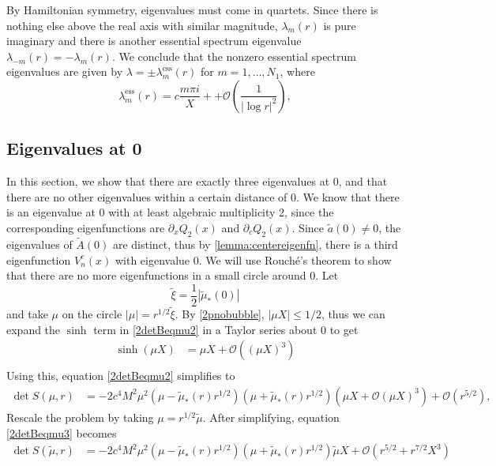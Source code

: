 \documentclass[thesis.tex]{subfiles}
\begin{document}
By Hamiltonian symmetry, eigenvalues must come in quartets. Since there is nothing else above the real axis with similar magnitude, $\lambda_m(r)$ is pure imaginary and there is another essential spectrum eigenvalue $\lambda_{-m}(r) = -\lambda_m(r)$. We conclude that the nonzero essential spectrum eigenvalues are given by $\lambda = \pm \lambda_m^{\text{ess}}(r)$ for $m = 1, \dots, N_1$, where
\[
\lambda_m^{\text{ess}}(r) = c \frac{m \pi i}{X} + +\mathcal{O}\left( \frac{1}{|\log r|^2} \right),
\]

\subsection{Eigenvalues at 0}\label{sec:eigcount0}

In this section, we show that there are exactly three eigenvalues at 0, and that there are no other eigenvalues within a certain distance of 0. We know that there is an eigenvalue at 0 with at least algebraic multiplicity 2, since the corresponding eigenfunctions are $\partial_x Q_2(x)$ and $\partial_c Q_2(x)$. Since $\tilde{a}(0) \neq 0$, the eigenvalues of $\tilde{A}(0)$ are distinct, thus by \cref{lemma:centereigenfn}, there is a third eigenfunction $V_n^c(x)$ with eigenvalue 0. We will use Rouch\'{e}'s theorem to show that there are no more eigenfunctions in a small circle around 0. Let
\[
\tilde{\xi} = \frac{1}{2}|\tilde{\mu}_*(0)|
\]
and take $\mu$ on the circle $|\mu| = r^{1/2} \tilde{\xi}$. By \cref{2pnobubble}, $|\mu X| \leq 1/2$, thus we can expand the $\sinh$ term in \cref{2detBeqmu2} in a Taylor series about 0 to get
\begin{equation*}
\begin{aligned}
\sinh(\mu X) &= \mu X + \mathcal{O}((\mu X)^3) \\
\end{aligned}
\end{equation*}
Using this, equation \cref{2detBeqmu2} simplifies to
\begin{equation}\label{2detBeqmu3}
\begin{aligned}
\det S(\mu, r) &= -2 c^4 M^2 \mu^2 (\mu - \tilde{\mu}_*(r)r^{1/2})(\mu + \tilde{\mu}_*(r)r^{1/2}) ( \mu X + \mathcal{O}(\mu X)^3) + \mathcal{O}\left( r^{5/2} \right),
\end{aligned}
\end{equation}
Rescale the problem by taking $\mu = r^{1/2}\tilde{\mu}$. After simplifying, equation \cref{2detBeqmu3} becomes
\begin{equation}\label{2detBeqmu4}
\begin{aligned}
\det S(\tilde{\mu}, r) &= -2 c^4 M^2 \mu^2 (\mu - \tilde{\mu}_*(r)r^{1/2})(\mu + \tilde{\mu}_*(r)r^{1/2}) \tilde{\mu} X + \mathcal{O}\left( r^{5/2} + r^{7/2}X^3 \right)
\end{aligned}
\end{equation}
\end{document}
